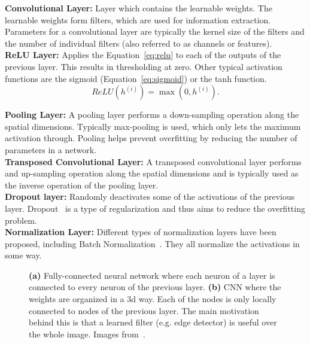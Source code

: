 \textbf{Convolutional Layer:} Layer which contains the learnable weights. The learnable weights form filters, which are used for information extraction. Parameters for a convolutional layer are typically the kernel size of the filters and the number of individual filters (also referred to as channels or features).\\

\textbf{ReLU Layer:} Applies the Equation~\ref{eq:relu} to each of the outputs of the previous layer. This results in thresholding at zero. Other typical activation functions are the sigmoid (Equation~\ref{eq:sigmoid}) or the tanh function.\\
\begin{equation}
   ReLU({h}^{(i)}) = \max(0, {h}^{(i)}).
   \label{eq:relu}
\end{equation}

\textbf{Pooling Layer:} A pooling layer performs a down-sampling operation along the spatial dimensions. Typically max-pooling is used, which only lets the maximum activation through. Pooling helps prevent overfitting by reducing the number of parameters in a network.\\

\textbf{Transposed Convolutional Layer:} A transposed convolutional layer performs and up-sampling operation along the spatial dimensions and is typically used as the inverse operation of the pooling layer.\\

\textbf{Dropout layer:} Randomly deactivates some of the activations of the previous layer. Dropout~\cite{Srivastava2014Dropout:Overfitting} is a type of regularization and thus aims to reduce the overfitting problem.\\

\textbf{Normalization Layer:} Different types of normalization layers have been proposed, including Batch Normalization~\cite{SergeyIoffe2015BatchNormalization}. They all normalize the activations in some way.
 
\begin{figure}[htbp]
	\centering
	\hfill
	\caption[Regular Neural Networks and Convolutional Neural Networks]{\textbf{(a)} Fully-connected neural network where each neuron of a layer is connected to every neuron of the previous layer. \textbf{(b)} CNN where the weights are organized in a \gls{3d} way. Each of the nodes is only locally connected to nodes of the previous layer. The main motivation behind this is that a learned filter (e.g. edge detector) is useful over the whole image. Images from~\cite{KarpathyStanfordRecognition}.}
	\label{fig:mlearn_nn_cnn}  
\end{figure}


